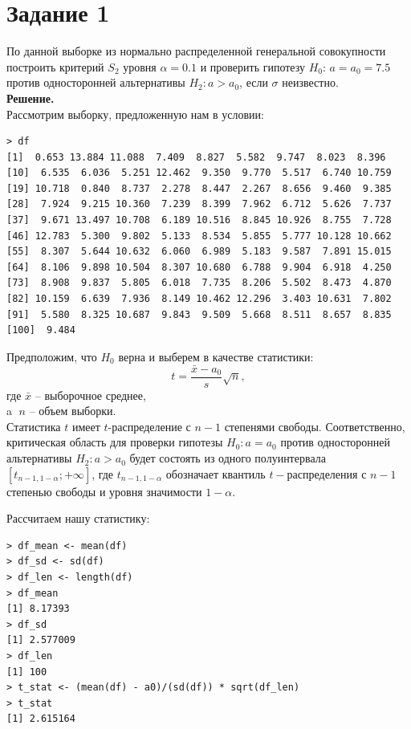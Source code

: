 \documentclass[14pt,a4paper]{scrartcl}
\begin{document}
\section*{Задание 1}\label{sec1}
По данной выборке из нормально распределенной генеральной совокупности построить критерий $S_2$ уровня $\alpha = 0.1$ и проверить гипотезу $H_0$: $a=a_0=7.5$  против односторонней альтернативы  $H_2: a>a_0$, если $\sigma$ неизвестно.\\
\textbf{Решение.}\\
Рассмотрим выборку, предложенную нам в условии:
\begin{verbatim}
> df
[1]  0.653 13.884 11.088  7.409  8.827  5.582  9.747  8.023  8.396
[10]  6.535  6.036  5.251 12.462  9.350  9.770  5.517  6.740 10.759
[19] 10.718  0.840  8.737  2.278  8.447  2.267  8.656  9.460  9.385
[28]  7.924  9.215 10.360  7.239  8.399  7.962  6.712  5.626  7.737
[37]  9.671 13.497 10.708  6.189 10.516  8.845 10.926  8.755  7.728
[46] 12.783  5.300  9.802  5.133  8.534  5.855  5.777 10.128 10.662
[55]  8.307  5.644 10.632  6.060  6.989  5.183  9.587  7.891 15.015
[64]  8.106  9.898 10.504  8.307 10.680  6.788  9.904  6.918  4.250
[73]  8.908  9.837  5.805  6.018  7.735  8.206  5.502  8.473  4.870
[82] 10.159  6.639  7.936  8.149 10.462 12.296  3.403 10.631  7.802
[91]  5.580  8.325 10.687  9.843  9.509  5.668  8.511  8.657  8.835
[100]  9.484
\end{verbatim}

Предположим, что $H_0$ верна и выберем в качестве статистики:
\begin{equation*}
	t = \frac{\bar{x} - a_0}{s} \sqrt{n},
\end{equation*}
где $\bar{x}$ -- выборочное среднее,\\
a $\; n$ -- объем выборки.\\
Статистика $t$ имеет $t$-распределение с $n-1$ степенями свободы. Соответственно, критическая область для проверки гипотезы $H_0: a = a_0$ против односторонней альтернативы $H_2: a > a_0$ будет состоять из одного полуинтервала $[t_{n-1,1-\alpha};+\infty]$, где $t_{n-1,1-\alpha}$ обозначает квантиль $t-$распределения с $n-1$ степенью свободы и уровня значимости $1-\alpha$.


Рассчитаем нашу статистику:
\begin{verbatim}
> df_mean <- mean(df)
> df_sd <- sd(df)
> df_len <- length(df)
> df_mean
[1] 8.17393
> df_sd
[1] 2.577009
> df_len
[1] 100
> t_stat <- (mean(df) - a0)/(sd(df)) * sqrt(df_len)
> t_stat
[1] 2.615164
\end{verbatim}
\end{document}
